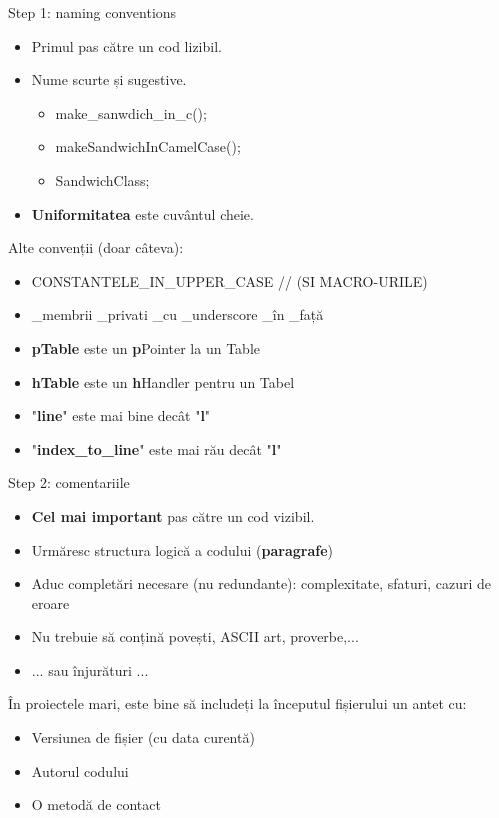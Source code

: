 \documentclass{beamer}
\begin{document}
\begin{frame}{Step 1: naming conventions}
	\begin{itemize}
		\item Primul pas către un cod lizibil.
		\pause
		\item Nume scurte și sugestive.
		\pause
			\begin{itemize}
			\item make\_sanwdich\_in\_c();
			\pause
			\item makeSandwichInCamelCase();
			\pause
			\item SandwichClass;
			\pause
			\end{itemize}
		\item {\bf Uniformitatea} este cuvântul cheie.
		\pause
	\end{itemize}
	Alte convenții (doar câteva):
	\begin{itemize}
		\item CONSTANTELE\_IN\_UPPER\_CASE // (SI MACRO-URILE)
		\pause
		\item \_membrii \_privati \_cu \_underscore \_în \_față
		\pause
		\item {\bf pTable} este un {\bf p}Pointer la un Table
		\pause
		\item {\bf hTable} este un {\bf h}Handler pentru un Tabel
		\pause
		\item "{\bf line}" este mai bine decât "{\bf l}"
		\pause
		\item "{\bf index\_to\_line}" este mai rău decât "{\bf l}"
		\pause
	\end{itemize}
\end{frame}

\begin{frame}{Step 2: comentariile}
	\begin{itemize}
		\item {\bf Cel mai important} pas către un cod vizibil.
		\pause
		\item Urmăresc structura logică a codului ({\bf paragrafe})
		\pause
		\item Aduc completări necesare (nu redundante): complexitate, sfaturi, cazuri de eroare
		\pause
		\item Nu trebuie să conțină povești, ASCII art, proverbe,...
		\pause
		\item ... sau înjurături ...
		\pause
	\end{itemize}
	În proiectele mari, este bine să includeți la începutul fișierului un antet cu:
	\begin{itemize}
		\item Versiunea de fișier (cu data curentă)
		\pause
		\item Autorul codului
		\pause
		\item O metodă de contact
		\pause
	\end{itemize}
\end{frame}
\end{document}
